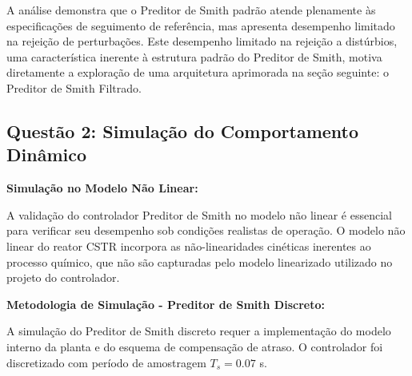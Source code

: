\documentclass[a4paper,12pt]{article}
\begin{document}
A análise demonstra que o Preditor de Smith padrão atende plenamente às especificações de seguimento de referência, mas apresenta desempenho limitado na rejeição de perturbações. Este desempenho limitado na rejeição a distúrbios, uma característica inerente à estrutura padrão do Preditor de Smith, motiva diretamente a exploração de uma arquitetura aprimorada na seção seguinte: o Preditor de Smith Filtrado.

\newpage


  



\subsection{Questão 2: Simulação do Comportamento Dinâmico}

\textbf{Simulação no Modelo Não Linear:}

A validação do controlador Preditor de Smith no modelo não linear é essencial para verificar seu desempenho sob condições realistas de operação. O modelo não linear do reator CSTR incorpora as não-linearidades cinéticas inerentes ao processo químico, que não são capturadas pelo modelo linearizado utilizado no projeto do controlador.

\textbf{Metodologia de Simulação - Preditor de Smith Discreto:}

A simulação do Preditor de Smith discreto requer a implementação do modelo interno da planta e do esquema de compensação de atraso. O controlador foi discretizado com período de amostragem $T_s = 0.07$ s.
\end{document}
